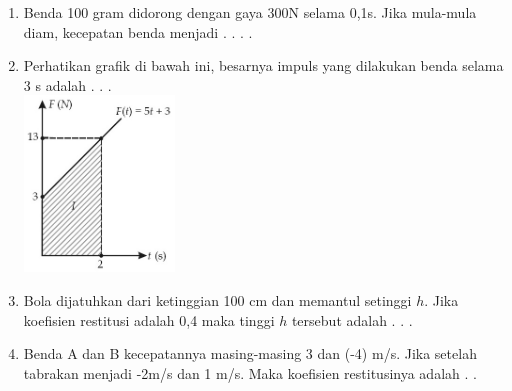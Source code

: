 \documentclass[10pt,a4paper]{extarticle}
\begin{document}
\begin{multicols*}{2}
\begin{enumerate}
\item Benda 100 gram didorong dengan gaya 300N selama 0,1s. Jika mula-mula diam, kecepatan benda menjadi . . . .
\vspace{2cm}


\item Perhatikan grafik di bawah ini, besarnya impuls yang dilakukan benda selama 3 s adalah . . . \\
\includegraphics[width=4cm]{pic/latul-mom3} 
\vspace{2cm}

\item Bola dijatuhkan dari ketinggian 100 cm dan memantul setinggi $h$. Jika koefisien restitusi adalah 0,4 maka tinggi $h$ tersebut adalah . . .
\vspace{2cm}

\item Benda A dan B kecepatannya masing-masing 3 dan (-4) m/s. Jika setelah tabrakan menjadi -2m/s dan 1 m/s. Maka koefisien restitusinya adalah . . 
\end{enumerate}
\end{multicols*}
\end{document}
